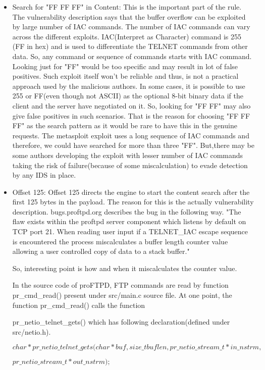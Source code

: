 \documentclass[11pt, pdftex]{article}
\begin{document}
\begin{enumerate}
\begin{itemize}
	\item Search for "FF FF FF" in Content: This is the important part of the rule. The vulnerability description says that the buffer overflow can be exploited by large number of IAC commands. The number of IAC commands can vary across the different exploits. IAC(Interpret as Character) command is 255 (FF in hex) and is used to differentiate the TELNET commands from other data. So, any command or sequence of commands starts with IAC command. Looking just for "FF" would be too specific and may result in lot of false positives. Such exploit itself won't be reliable and thus, is not a practical approach used by the malicious authors. In some cases, it is possible to use 255 or FF(even though not ASCII) as the optional 8-bit binary data if the client and the server have negotiated on it. So, looking for "FF FF" may also give false positives in such scenarios. That is the reason for choosing "FF FF FF" as the search pattern as it would be rare to have this in the genuine requests. The metasploit exploit uses a long sequence of IAC commands and therefore, we could have searched for more than three "FF". But,there may be some authors developing the exploit with lesser number of IAC commands taking the risk of failure(because of some miscalculation) to evade detection by any IDS in place.
	\item Offset 125: Offset 125 directs the engine to start the content search after the first 125 bytes in the payload. The reason for this is the actually vulnerability description. bugs.proftpd.org describes the bug in the following way.
	"The flaw exists within the proftpd server component which listens by default on TCP port 21. When reading user input if a TELNET\_IAC escape sequence is encountered the process miscalculates a buffer length counter value allowing a user controlled copy of data to a stack buffer."	

So, interesting point is how and when it miscalculates the counter value.	
	  
In the source code of proFTPD, FTP commands are read by function pr\_cmd\_read() present under src/main.c source file. At one point, the function pr\_cmd\_read() calls the function

pr\_netio\_telnet\_gets() which has following declaration(defined under src/netio.h).
   
    $char *pr\_netio\_telnet\_gets(char *buf, size\_t buflen,
    pr\_netio\_stream\_t *in\_nstrm,$ 
    
    $pr\_netio\_stream\_t *out\_nstrm);$
   

\end{itemize}
\end{enumerate}
\end{document}

